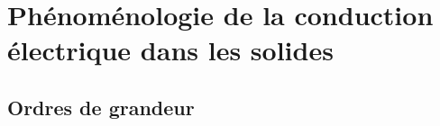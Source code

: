 \documentclass[11pt,a4paper]{report}
\begin{document}
\newpage
\section{Phénoménologie de la conduction électrique dans les solides}



\subsection{Ordres de grandeur}
\end{document}
